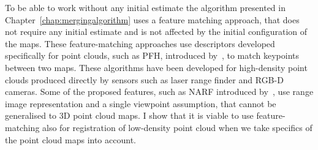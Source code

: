 To be able to work without any initial estimate the algorithm presented in Chapter~\ref{chap:mergingalgorithm} uses a feature matching approach, that does not require any initial estimate and is not affected by the initial configuration of the maps. These feature-matching approaches use descriptors developed specifically for point clouds, such as \gls{PFH}, introduced by~\citet{rusu2008pfh}, to match keypoints between two maps. These algorithms have been developed for high-density point clouds produced directly by sensors such as laser range finder and \gls{RGB-D} cameras. Some of the proposed features, such as \gls{NARF} introduced by~\citet{steder2010narf}, use range image representation and a single viewpoint assumption, that cannot be generalised to \gls{3D} point cloud maps. I show that it is viable to use feature-matching also for registration of low-density point cloud when we take specifics of the point cloud maps into account.

